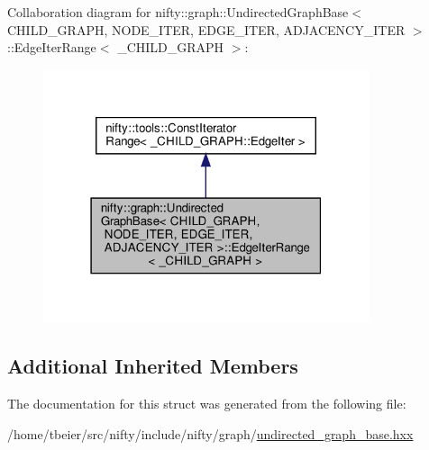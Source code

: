 Collaboration diagram for nifty\+:\+:graph\+:\+:Undirected\+Graph\+Base$<$ C\+H\+I\+L\+D\+\_\+\+G\+R\+A\+PH, N\+O\+D\+E\+\_\+\+I\+T\+ER, E\+D\+G\+E\+\_\+\+I\+T\+ER, A\+D\+J\+A\+C\+E\+N\+C\+Y\+\_\+\+I\+T\+ER $>$\+:\+:Edge\+Iter\+Range$<$ \+\_\+\+C\+H\+I\+L\+D\+\_\+\+G\+R\+A\+PH $>$\+:
\nopagebreak
\begin{figure}[H]
\begin{center}
\leavevmode
\includegraphics[width=271pt]{structnifty_1_1graph_1_1UndirectedGraphBase_1_1EdgeIterRange__coll__graph}
\end{center}
\end{figure}
\subsection*{Additional Inherited Members}


The documentation for this struct was generated from the following file\+:\begin{DoxyCompactItemize}
\item 
/home/tbeier/src/nifty/include/nifty/graph/\hyperlink{undirected__graph__base_8hxx}{undirected\+\_\+graph\+\_\+base.\+hxx}\end{DoxyCompactItemize}
